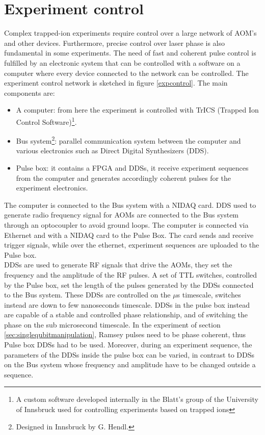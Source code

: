 \section{Experiment control}
\label{sec:expcontrol}
Complex trapped-ion experiments require control over a large network of AOM's and other devices. Furthermore, precise control over laser phase is also fundamental in some experiments. The need of fast and coherent pulse control is fulfilled by an electronic system that can be controlled with a software on a computer where every device connected to the network can be controlled. The experiment control network is sketched in figure \ref{expcontrol}. The main components are:
\begin{itemize}
\item A computer: from here the experiment is controlled with TrICS (Trapped Ion Control Software)\footnote{A custom software developed internally in the Blatt's group of the University of Innsbruck used for controlling experiments based on trapped ions}.
\item Bus system\footnote{Designed in Innsbruck by G. Hendl.}: parallel communication system between the computer and various electronics such as Direct Digital Synthesizers (DDS).
\item Pulse box: it contains a FPGA and DDSs, it receive experiment sequences from the computer and generates accordingly coherent pulses for the experiment electronics.
\end{itemize}
The computer is connected to the Bus system with a NIDAQ card. DDS used to generate radio frequency signal for AOMs are connected to the Bus system through an optocoupler to avoid ground loops. The computer is connected via Ethernet and with a NIDAQ card to the Pulse Box. The card sends and receive trigger signals, while over the ethernet, experiment sequences are uploaded to the Pulse box.\\
DDSs are used to generate RF signals that drive the AOMs, they set the frequency and the amplitude of the RF pulses. A set of TTL switches, controlled by the Pulse box, set the length of the pulses generated by the DDSs connected to the Bus system. These DDSs are controlled on the $\mu$s timescale, switches instead are down to few nanoseconds timescale. DDSs in the pulse box instead are capable of a stable and controlled phase relationship, and of switching the phase on the sub microsecond timescale. In the experiment of section \ref{sec:singlequbitmanipulation}, Ramsey pulses need to be phase coherent, thus Pulse box DDSs had to be used. Moreover, during an experiment sequence, the parameters of the DDSs inside the pulse box can be varied, in contrast to DDSs on the Bus system whose frequency and amplitude have to be changed outside a sequence.\\
